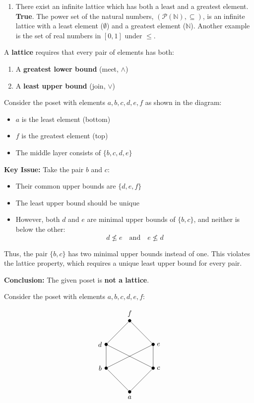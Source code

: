 \documentclass[10pt]{article}
\theoremstyle{definition}
\theoremstyle{plain}
\numberwithin{equation}{section}
\begin{document}
\begin{enumerate}
  \item There exist an infinite lattice which has both a least and a greatest element. \\
  \textbf{True}. The power set of the natural numbers, $(\mathcal{P}(\mathbb{N}), \subseteq)$, is an infinite lattice with a least element ($\emptyset$) and a greatest element ($\mathbb{N}$). Another example is the set of real numbers in $[0,1]$ under $\leq$.

\end{enumerate}



A \textbf{lattice} requires that every pair of elements has both:
\begin{enumerate}
  \item A \textbf{greatest lower bound} (meet, $\wedge$)
  \item A \textbf{least upper bound} (join, $\vee$)
\end{enumerate}

Consider the poset with elements $a, b, c, d, e, f$ as shown in the diagram:
\begin{itemize}
  \item $a$ is the least element (bottom)
  \item $f$ is the greatest element (top)
  \item The middle layer consists of $\{b, c, d, e\}$
\end{itemize}

\textbf{Key Issue:} Take the pair $b$ and $c$:
\begin{itemize}
  \item Their common upper bounds are $\{d, e, f\}$
  \item The least upper bound should be unique
  \item However, both $d$ and $e$ are minimal upper bounds of $\{b, c\}$, and neither is below the other:
  \[
    d \nleq e \quad \text{and} \quad e \nleq d
  \]
\end{itemize}

Thus, the pair $\{b, c\}$ has two minimal upper bounds instead of one. This violates the lattice property, which requires a unique least upper bound for every pair.

\textbf{Conclusion:} The given poset is \textbf{not a lattice}.


Consider the poset with elements $a, b, c, d, e, f$:

\[
\begin{tikzpicture}[scale=1.2, every node/.style={circle,draw,fill=black,inner sep=1.5pt}]
\node[label=below:$a$] (a) at (0,0) {};
\node[label=left:$b$] (b) at (-1,1) {};
\node[label=right:$c$] (c) at (1,1) {};
\node[label=left:$d$] (d) at (-1,2) {};
\node[label=right:$e$] (e) at (1,2) {};
\node[label=above:$f$] (f) at (0,3) {};

\draw (a)--(b)--(d)--(f);
\draw (a)--(c)--(e)--(f);
\draw (b)--(e);
\draw (c)--(d);


\end{tikzpicture}
\]
\end{document}
